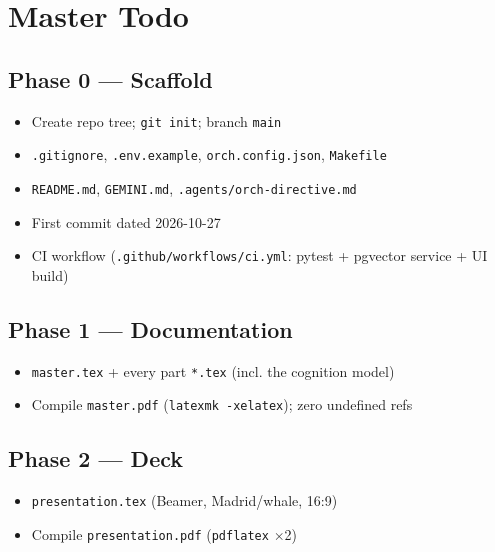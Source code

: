 \chapter{Master Todo}

\section{Phase 0 --- Scaffold}
\begin{itemize}
  \item[$\boxtimes$] Create repo tree; \texttt{git init}; branch \texttt{main}
  \item[$\boxtimes$] \texttt{.gitignore}, \texttt{.env.example}, \texttt{orch.config.json}, \texttt{Makefile}
  \item[$\boxtimes$] \texttt{README.md}, \texttt{GEMINI.md}, \texttt{.agents/orch-directive.md}
  \item[$\boxtimes$] First commit dated 2026-10-27
  \item[$\boxtimes$] CI workflow (\texttt{.github/workflows/ci.yml}: pytest + pgvector service + UI build)
\end{itemize}

\section{Phase 1 --- Documentation}
\begin{itemize}
  \item[$\boxtimes$] \texttt{master.tex} + every part \texttt{*.tex} (incl. the cognition model)
  \item[$\boxtimes$] Compile \texttt{master.pdf} (\texttt{latexmk -xelatex}); zero undefined refs
\end{itemize}

\section{Phase 2 --- Deck}
\begin{itemize}
  \item[$\boxtimes$] \texttt{presentation.tex} (Beamer, Madrid/whale, 16:9)
  \item[$\boxtimes$] Compile \texttt{presentation.pdf} (\texttt{pdflatex} $\times$2)
\end{itemize}

